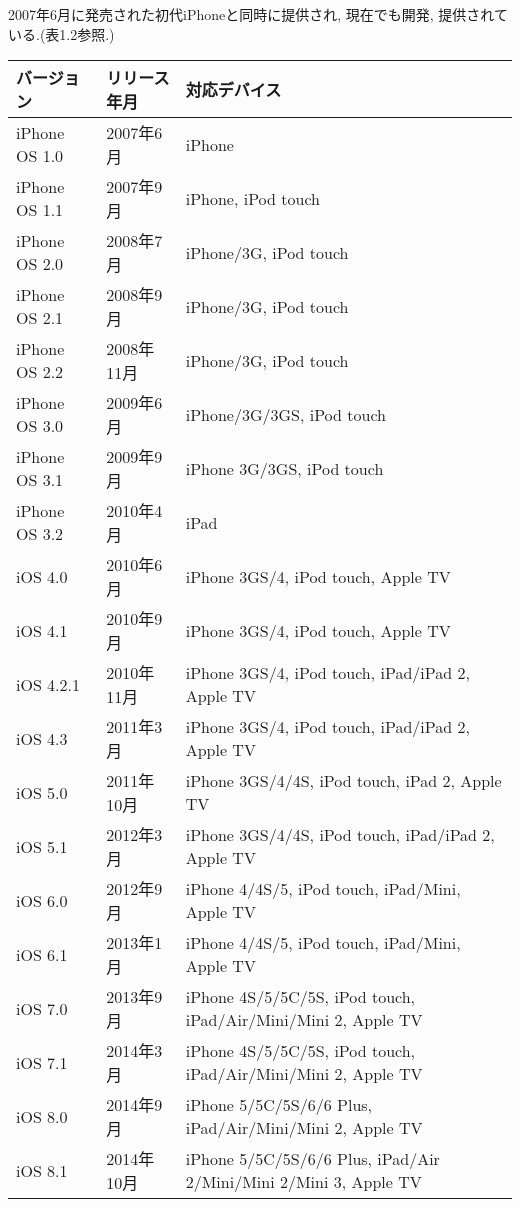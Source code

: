 2007年6月に発売された初代iPhoneと同時に提供され, 現在でも開発, 提供されている.(表1.2参照.)

\begin{table}[htb]
\begin{center}
\begin{tabular}{|l|l|p{10cm}|} \hline
バージョン & リリース年月 & 対応デバイス \\ \hline \hline
iPhone OS 1.0 & 2007年6月 & iPhone \\ \hline
iPhone OS 1.1 & 2007年9月 & iPhone, iPod touch \\ \hline
iPhone OS 2.0 & 2008年7月 & iPhone/3G, iPod touch \\ \hline
iPhone OS 2.1 & 2008年9月 & iPhone/3G, iPod touch \\ \hline
iPhone OS 2.2 & 2008年11月 & iPhone/3G, iPod touch \\ \hline
iPhone OS 3.0 & 2009年6月 & iPhone/3G/3GS, iPod touch \\ \hline
iPhone OS 3.1 & 2009年9月 & iPhone 3G/3GS, iPod touch \\ \hline
iPhone OS 3.2 & 2010年4月 & iPad \\ \hline
iOS 4.0 & 2010年6月 & iPhone 3GS/4, iPod touch, Apple TV \\ \hline
iOS 4.1 & 2010年9月 & iPhone 3GS/4, iPod touch, Apple TV \\ \hline
iOS 4.2.1 & 2010年11月 & iPhone 3GS/4, iPod touch, iPad/iPad 2, Apple TV \\ \hline
iOS 4.3 & 2011年3月 & iPhone 3GS/4, iPod touch, iPad/iPad 2, Apple TV \\ \hline
iOS 5.0 & 2011年10月 & iPhone 3GS/4/4S, iPod touch, iPad 2, Apple TV \\ \hline
iOS 5.1 & 2012年3月 & iPhone 3GS/4/4S, iPod touch, iPad/iPad 2, Apple TV \\ \hline
iOS 6.0 & 2012年9月 & iPhone 4/4S/5, iPod touch, iPad/Mini, Apple TV \\ \hline
iOS 6.1 & 2013年1月 & iPhone 4/4S/5, iPod touch, iPad/Mini, Apple TV \\ \hline
iOS 7.0 & 2013年9月 & iPhone 4S/5/5C/5S, iPod touch, iPad/Air/Mini/Mini 2, Apple TV \\ \hline
iOS 7.1 & 2014年3月 & iPhone 4S/5/5C/5S, iPod touch, iPad/Air/Mini/Mini 2, Apple TV \\ \hline
iOS 8.0 & 2014年9月 & iPhone 5/5C/5S/6/6 Plus, iPad/Air/Mini/Mini 2, Apple TV \\ \hline
iOS 8.1 & 2014年10月 & iPhone 5/5C/5S/6/6 Plus, iPad/Air 2/Mini/Mini 2/Mini 3, Apple TV \\ \hline

\end{tabular}
\end{center}
\end{table}
